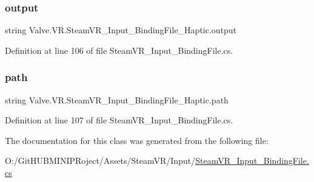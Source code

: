 \subsubsection{\texorpdfstring{output}{output}}
{\footnotesize\ttfamily string Valve.\+V\+R.\+Steam\+V\+R\+\_\+\+Input\+\_\+\+Binding\+File\+\_\+\+Haptic.\+output}



Definition at line 106 of file Steam\+V\+R\+\_\+\+Input\+\_\+\+Binding\+File.\+cs.

\mbox{\label{class_valve_1_1_v_r_1_1_steam_v_r___input___binding_file___haptic_ac4fbdb79f8b72bfe206bf8ef337b7b6d}} 
\subsubsection{\texorpdfstring{path}{path}}
{\footnotesize\ttfamily string Valve.\+V\+R.\+Steam\+V\+R\+\_\+\+Input\+\_\+\+Binding\+File\+\_\+\+Haptic.\+path}



Definition at line 107 of file Steam\+V\+R\+\_\+\+Input\+\_\+\+Binding\+File.\+cs.



The documentation for this class was generated from the following file\+:\begin{DoxyCompactItemize}
\item 
O\+:/\+Git\+H\+U\+B\+M\+I\+N\+I\+P\+Roject/\+Assets/\+Steam\+V\+R/\+Input/\mbox{\hyperlink{_steam_v_r___input___binding_file_8cs}{Steam\+V\+R\+\_\+\+Input\+\_\+\+Binding\+File.\+cs}}\end{DoxyCompactItemize}
